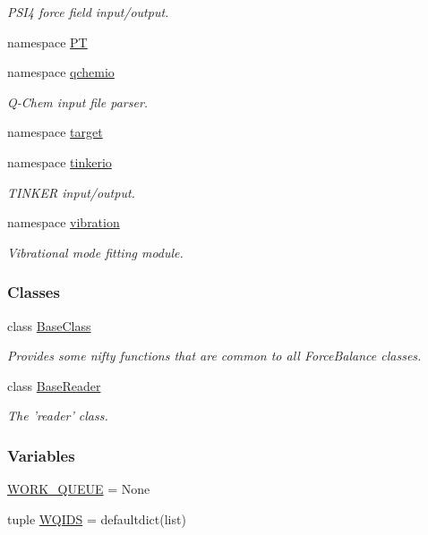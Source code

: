 \begin{DoxyCompactItemize}
\begin{DoxyCompactList}\small\item\em \-P\-S\-I4 force field input/output. \end{DoxyCompactList}\item 
namespace \hyperlink{namespaceforcebalance_1_1PT}{\-P\-T}
\item 
namespace \hyperlink{namespaceforcebalance_1_1qchemio}{qchemio}
\begin{DoxyCompactList}\small\item\em \-Q-\/\-Chem input file parser. \end{DoxyCompactList}\item 
namespace \hyperlink{namespaceforcebalance_1_1target}{target}
\item 
namespace \hyperlink{namespaceforcebalance_1_1tinkerio}{tinkerio}
\begin{DoxyCompactList}\small\item\em \-T\-I\-N\-K\-E\-R input/output. \end{DoxyCompactList}\item 
namespace \hyperlink{namespaceforcebalance_1_1vibration}{vibration}
\begin{DoxyCompactList}\small\item\em \-Vibrational mode fitting module. \end{DoxyCompactList}\end{DoxyCompactItemize}
\subsubsection*{\-Classes}
\begin{DoxyCompactItemize}
\item 
class \hyperlink{classforcebalance_1_1BaseClass}{\-Base\-Class}
\begin{DoxyCompactList}\small\item\em \-Provides some nifty functions that are common to all \-Force\-Balance classes. \end{DoxyCompactList}\item 
class \hyperlink{classforcebalance_1_1BaseReader}{\-Base\-Reader}
\begin{DoxyCompactList}\small\item\em \-The 'reader' class. \end{DoxyCompactList}\end{DoxyCompactItemize}
\subsubsection*{\-Variables}
\begin{DoxyCompactItemize}
\item 
\hyperlink{namespaceforcebalance_a9cf7d53eb5cdb4db2b876eb59ba83075}{\-W\-O\-R\-K\-\_\-\-Q\-U\-E\-U\-E} = \-None
\item 
tuple \hyperlink{namespaceforcebalance_a77a3598d98b784c79e15e9fef3a1c72c}{\-W\-Q\-I\-D\-S} = defaultdict(list)
\end{DoxyCompactItemize}


